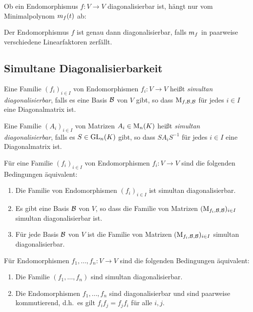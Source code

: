 
Ob ein Endomorphismus $f \colon V \to V$ diagonalisierbar ist, hängt nur vom Minimalpolynom $m_{f}(t)$ ab:

\begin{proposition}
  Der Endomorphismus $f$ ist genau dann diagonalisierbar, falls $m_{f}$ in paarweise verschiedene Linearfaktoren zerfällt.
\end{proposition}





\subsection{Simultane Diagonalisierbarkeit}

\begin{definition}
  Eine Familie $(f_i)_{i \in I}$ von Endomorphismen $f_i \colon V \to V$ heißt \emph{simultan diagonalisierbar}, falls es eine Basis $\mathcal{B}$ von $V$ gibt, so dass $\operatorname{M}_{f, \mathcal{B}, \mathcal{B}}$ für jedes $i \in I$ eine Diagonalmatrix ist.
  
  Eine Familie $(A_i)_{i \in I}$ von Matrizen $A_i \in \operatorname{M}_{n}(K)$ heißt \emph{simultan diagonalisierbar}, falls es $S \in \operatorname{GL}_{n}(K)$ gibt, so dass $S A_i S^{-1}$ für jedes $i \in I$ eine Diagonalmatrix ist.
\end{definition}

\begin{lemma}
  Für eine Familie $(f_i)_{i \in I}$ von Endomorphismen $f_i \colon V \to V$ sind die folgenden Bedingungen äquivalent:
  \begin{enumerate}
    \item
      Die Familie von Endomorphismen $(f_i)_{i \in I}$ ist simultan diagonalisierbar.
    \item
      Es gibt eine Basis $\mathcal{B}$ von $V$, so dass die Familie von Matrizen $(\operatorname{M}_{f_i, \mathcal{B}, \mathcal{B}})_{i \in I}$ simultan diagonalisierbar ist.
    \item
      Für jede Basis $\mathcal{B}$ von $V$ ist die Familie von Matrizen $(\operatorname{M}_{f_i, \mathcal{B}, \mathcal{B}})_{i \in I}$ simultan diagonalisierbar.
  \end{enumerate}
\end{lemma}

\begin{proposition}
  Für Endomorphismen $f_1, \dotsc, f_n \colon V \to V$ sind die folgenden Bedingungen äquivalent:
  \begin{enumerate}
    \item
      Die Familie $(f_1, \dotsc, f_n)$ sind simultan diagonalisierbar.
    \item
      Die Endomorphismen $f_1, \dotsc, f_n$ sind diagonalisierbar und sind paarweise kommutierend, d.h.\ es gilt $f_i f_j = f_j f_i$ für alle $i, j$.
  \end{enumerate}
\end{proposition}

